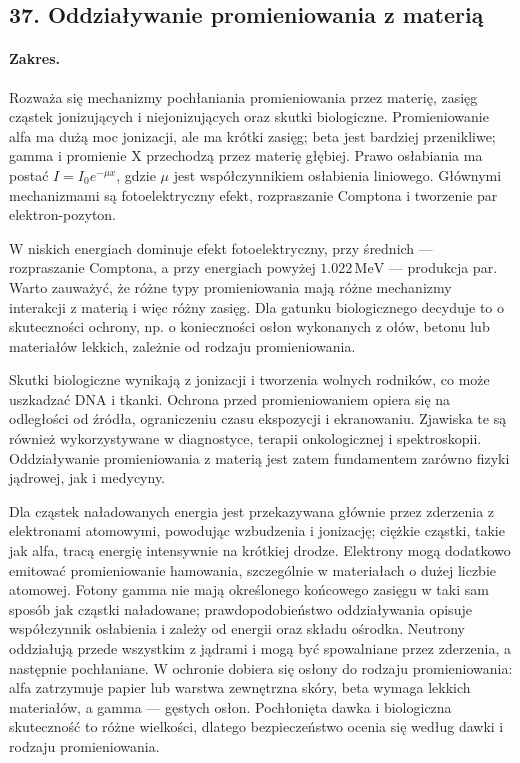 \documentclass[11pt,a4paper]{article}
\begin{document}
\subsection{37. Oddziaływanie promieniowania z materią}
\paragraph{Zakres.} Rozważa się mechanizmy pochłaniania promieniowania przez materię, zasięg cząstek jonizujących i niejonizujących oraz skutki biologiczne. Promieniowanie alfa ma dużą moc jonizacji, ale ma krótki zasięg; beta jest bardziej przenikliwe; gamma i promienie X przechodzą przez materię głębiej. Prawo osłabiania ma postać $I=I_0e^{-\mu x}$, gdzie $\mu$ jest współczynnikiem osłabienia liniowego. Głównymi mechanizmami są fotoelektryczny efekt, rozpraszanie Comptona i tworzenie par elektron-pozyton.\par
W niskich energiach dominuje efekt fotoelektryczny, przy średnich — rozpraszanie Comptona, a przy energiach powyżej $1.022\,\mathrm{MeV}$ — produkcja par. Warto zauważyć, że różne typy promieniowania mają różne mechanizmy interakcji z materią i więc różny zasięg. Dla gatunku biologicznego decyduje to o skuteczności ochrony, np. o konieczności osłon wykonanych z ołów, betonu lub materiałów lekkich, zależnie od rodzaju promieniowania.\par
Skutki biologiczne wynikają z jonizacji i tworzenia wolnych rodników, co może uszkadzać DNA i tkanki. Ochrona przed promieniowaniem opiera się na odległości od źródła, ograniczeniu czasu ekspozycji i ekranowaniu. Zjawiska te są również wykorzystywane w diagnostyce, terapii onkologicznej i spektroskopii. Oddziaływanie promieniowania z materią jest zatem fundamentem zarówno fizyki jądrowej, jak i medycyny.\par

Dla cząstek naładowanych energia jest przekazywana głównie przez zderzenia z elektronami atomowymi, powodując wzbudzenia i jonizację; ciężkie cząstki, takie jak alfa, tracą energię intensywnie na krótkiej drodze. Elektrony mogą dodatkowo emitować promieniowanie hamowania, szczególnie w materiałach o dużej liczbie atomowej. Fotony gamma nie mają określonego końcowego zasięgu w taki sam sposób jak cząstki naładowane; prawdopodobieństwo oddziaływania opisuje współczynnik osłabienia i zależy od energii oraz składu ośrodka. Neutrony oddziałują przede wszystkim z jądrami i mogą być spowalniane przez zderzenia, a następnie pochłaniane. W ochronie dobiera się osłony do rodzaju promieniowania: alfa zatrzymuje papier lub warstwa zewnętrzna skóry, beta wymaga lekkich materiałów, a gamma — gęstych osłon. Pochłonięta dawka i biologiczna skuteczność to różne wielkości, dlatego bezpieczeństwo ocenia się według dawki i rodzaju promieniowania.
\par
\end{document}
